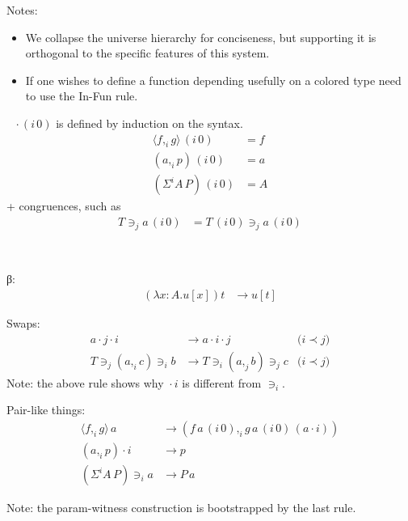 \documentclass[english]{PaperTools/latex/lipics}
\newcommand\CP[3]{(#2,_{#1} #3)}
\newcommand\param[1]{\!\cdot\!#1}
\newcommand\op[1]{∋_{#1}}
\newcommand\ip[3]{Σ^{#1} {#2}\,{#3}}
\newcommand\fp[3]{⟨#2 ,_{#1} #3⟩}
\newcommand\mor[2]{{#1}\,{#2}}
\newcommand\proj[2]{\mor{#2}{(#1\,0)}}
\newcommand\projp[2]{\proj{#1}{(#2)}}
\newcommand\comment[1]{}
\begin{document}
Notes:

\begin{itemize}
\item We collapse the universe hierarchy for conciseness, but
  supporting it is orthogonal to the specific features of this system.
\item If one wishes to define a function depending usefully on a colored type
  need to use the {\sc In-Fun} rule.
\end{itemize}

\begin{definition}[Projection]~
  $\proj i \cdot$ is defined by induction on the syntax.
\begin{align*}
    \proj i {\fp i f g} & = f \\
  \proj i {(a,_i p)} &= a \\
  \projp i {\ip i A P} &= A
\end{align*}
+ congruences, such as
\begin{align*}
  \proj i {T \op j a} &= {\proj i T \op j \proj i a}
\end{align*}
\end{definition}


\comment{
\begin{definition}[Normal forms and neutral terms]~
  \begin{align*}
    \mathsf{Nf} ∋ u,v,A,B & \coloneqq
      U \mid λx:A. t \mid (x:A) → B \\
      & \mid \CP i u v \mid \fp i u v \\
      & \mid {(\ip {i₀} A B)} \op {i₁} {u_1 \cdots} \op {i_n} {u_n} &\quad \text{($i₀ \prec i₁ \prec \ldots \prec i_n$)} \\
      & \mid s \param {i₀} \cdots \param {i_{n-1}}                  &\quad \text{($i₀ \prec   < \ldots \prec i_{n-1}$)}
    \\
    \mathsf{Ne} ∋ s & \coloneqq x \mid s \, u
  \end{align*}
\end{definition}
}
\begin{definition}~

β:
\begin{align*}
  (λx:A. u[x]) t &→ u[t]
\end{align*}

Swaps:
\begin{align*}
  a \param j \param i &→ a \param i \param j             &\text{($i \prec j$)} \\
  T \op j \CP i a c \op i b &→ T \op i \CP j a b \op j c &\text{($i \prec j$)}
\end{align*}
Note: the above rule shows why ${} \param i {}$ is different from $\op i {}$.

Pair-like things:
\begin{align*}
  {\fp i f g} \, a      &→ (f\,{\proj i a} ,_i g\,{\proj i a}\,{(a \param i)}) \\
  {(a,_i p)} \param i   &→ p \\
  {(\ip i A P)} \op i a &→ P\,a
\end{align*}

Note: the param-witness construction is bootstrapped by the last rule.

\end{definition}
\end{document}
